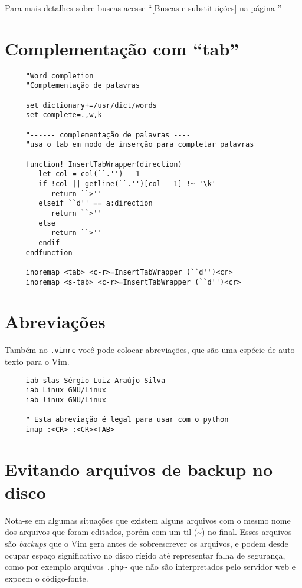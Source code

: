Para mais detalhes sobre buscas acesse ``\ref{Buscas e substituições}
na página \pageref{Buscas e substituições}''

\section{Complementação com ``tab''}\label{Complementação com ``tab''}

\begin{verbatim}
     "Word completion
     "Complementação de palavras
     
     set dictionary+=/usr/dict/words
     set complete=.,w,k
     
     "------ complementação de palavras ----
     "usa o tab em modo de inserção para completar palavras
     
     function! InsertTabWrapper(direction)
        let col = col(``.'') - 1
        if !col || getline(``.'')[col - 1] !~ '\k'
           return ``>''
        elseif ``d'' == a:direction
           return ``>''
        else
           return ``>''
        endif
     endfunction
     
     inoremap <tab> <c-r>=InsertTabWrapper (``d'')<cr>
     inoremap <s-tab> <c-r>=InsertTabWrapper (``d'')<cr>
\end{verbatim}

\section{Abreviações}\label{Abreviações}
Também no \verb|.vimrc| você pode colocar abreviações, que são uma espécie de
auto-texto para o Vim.

\begin{verbatim}
     iab slas Sérgio Luiz Araújo Silva
     iab Linux GNU/Linux
     iab linux GNU/Linux
     
     " Esta abreviação é legal para usar com o python
     imap :<CR> :<CR><TAB>
\end{verbatim}

\section{Evitando arquivos de backup no disco}
\label{Evitando arquivos de backup no disco}

Nota-se em algumas situações que existem alguns arquivos com o mesmo nome dos arquivos que foram editados, porém com um
til (\textasciitilde) no final. Esses arquivos são {\em backups} que o Vim gera antes de sobreescrever os arquivos, e podem
desde ocupar espaço significativo no disco rígido até representar falha de segurança, como por exemplo arquivos 
{\tt .php\textasciitilde} que não são interpretados pelo servidor web e expoem o código-fonte.

